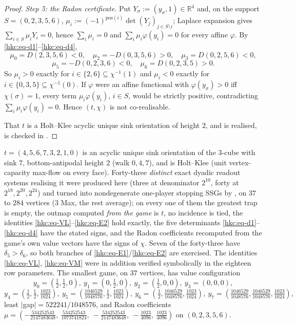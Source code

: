 \begin{proof}
\emph{Step 5: the Radon certificate.} Put $Y_\sigma:=(y_\sigma,1)\in\mathbb R^4$
and, on the support $S=(0,2,3,5,6)$, $\mu_i:=(-1)^{\mathrm{pos}(i)}
\det(Y_j)_{j\in S\setminus i}$; Laplace expansion gives
$\sum_{i\in S}\mu_iY_i=0$, hence $\sum_i\mu_i=0$ and
$\sum_i\mu_i\varphi(y_i)=0$ for every affine $\varphi$. By
\eqref{hkc:eq-d1}--\eqref{hkc:eq-d4},
\[
  \mu_0=D(2,3,5,6)<0,\quad \mu_2=-D(0,3,5,6)>0,\quad \mu_3=D(0,2,5,6)<0,
\]
\[
  \mu_5=-D(0,2,3,6)<0,\quad \mu_6=D(0,2,3,5)>0 .
\]
So $\mu_i>0$ exactly for $i\in\{2,6\}\subseteq\chi^{-1}(1)$ and $\mu_i<0$
exactly for $i\in\{0,3,5\}\subseteq\chi^{-1}(0)$. If $\varphi$ were an affine
functional with $\varphi(y_\sigma)>0$ iff $\chi(\sigma)=1$, every term
$\mu_i\varphi(y_i)$, $i\in S$, would be strictly positive, contradicting
$\sum_i\mu_i\varphi(y_i)=0$. Hence $(t,\chi)$ is not co-realisable.

That $t$ is a Holt--Klee acyclic unique sink orientation of height $2$, and is
realised, is checked in .
\end{proof}

\begin{proposition}\label{hkc:realised}
$t=(4,5,6,7,3,2,1,0)$ is an acyclic unique sink orientation of the $3$-cube
with sink $7$, bottom-antipodal height $2$ (walk $0,4,7$), and is Holt--Klee (unit
vertex-capacity max-flow on every face). Forty-three \emph{distinct} exact
dyadic readout systems realising it were produced here (three at denominator
$2^{10}$, forty at $2^{18},2^{20},2^{24}$) and turned into nondegenerate
one-player stopping SSGs by , on $37$ to $284$ vertices
($3$ Max, the rest average); on every one of them the greatest trap is empty,
the outmap computed \emph{from the game} is $t$, no incidence is tied, the
identities \eqref{hkc:eq-VL}--\eqref{hkc:eq-E2} hold exactly, the five
determinants \eqref{hkc:eq-d1}--\eqref{hkc:eq-d4} have the stated signs, and
the Radon coefficients recomputed from the game's own value vectors have the
signs of $\chi$. Seven of the forty-three have $\delta_5>\delta_6$, so both
branches of \eqref{hkc:eq-E1}/\eqref{hkc:eq-E2} are exercised. The identities
\eqref{hkc:eq-VL}, \eqref{hkc:eq-VM} were in addition verified symbolically in
the eighteen row parameters. The smallest game,
on $37$ vertices, has value configuration
\[
 y_0=(\tfrac12,\tfrac12,0),\ y_1=(0,\tfrac12,0),\ y_2=(\tfrac12,0,0),\ y_3=(0,0,0),
\]
\[
 y_4=(\tfrac12,\tfrac12,\tfrac{1023}{1024}),\
 y_5=(\tfrac{1046529}{1048576},\tfrac12,\tfrac{1023}{1024}),\
 y_6=(\tfrac12,\tfrac{1046529}{1048576},\tfrac{1023}{1024}),\
 y_7=(\tfrac{1046529}{1048576},\tfrac{1046529}{1048576},\tfrac{1023}{1024}),
\]
least $|$gap$|=522241/1048576$, and Radon coefficients
$\mu=(-\tfrac{534252543}{2147483648},\ \tfrac{534252543}{1073741824},\
-\tfrac{534252543}{2147483648},\ -\tfrac{1023}{4096},\ \tfrac{1023}{4096})$
on $(0,2,3,5,6)$.
\end{proposition}

